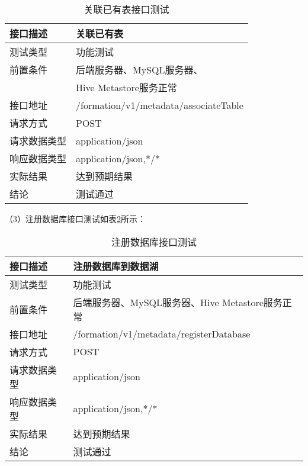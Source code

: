\begin{table}[H]
  \centering
  \caption{关联已有表接口测试}
  \label{tab:exampletable5}
  \begin{tabular}{ll}
    \toprule
    接口描述         & 关联已有表         \\
    \midrule
    测试类型         & 功能测试         \\
    前置条件         & 后端服务器、MySQL服务器、        \\
                    &  Hive Metastore服务正常         \\
    接口地址       & /formation/v1/metadata/associateTable        \\
    请求方式         & POST      \\
    请求数据类型         & application/json     \\
    响应数据类型         & application/json,*/*           \\
    实际结果         & 达到预期结果           \\
    结论            & 测试通过           \\
    \bottomrule
  \end{tabular}
\end{table}

（3）注册数据库接口测试如表\ref{tab:exampletable6}所示：

\begin{table}[H]
  \centering
  \caption{注册数据库接口测试}
  \label{tab:exampletable6}
  \begin{tabular}{ll}
    \toprule
    接口描述         & 注册数据库到数据湖         \\
    \midrule
    测试类型         & 功能测试         \\
    前置条件         & 后端服务器、MySQL服务器、Hive Metastore服务正常         \\
    接口地址       & /formation/v1/metadata/registerDatabase        \\
    请求方式         & POST      \\
    请求数据类型         & application/json     \\
    响应数据类型         & application/json,*/*           \\
    实际结果         & 达到预期结果           \\
    结论            & 测试通过           \\
    \bottomrule
  \end{tabular}
\end{table}

